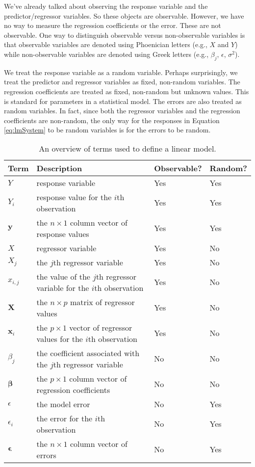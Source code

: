 \documentclass[
]{book}
\theoremstyle{definition}
\theoremstyle{definition}
\theoremstyle{definition}
\theoremstyle{definition}
\theoremstyle{remark}
\begin{document}
We've already talked about observing the response variable and the predictor/regressor variables. So these objects are observable. However, we have no way to measure the regression coefficients or the error. These are not observable. One way to distinguish observable versus non-observable variables is that observable variables are denoted using Phoenician letters (e.g., \(X\) and \(Y\)) while non-observable variables are denoted using Greek letters (e.g., \(\beta_j\), \(\epsilon\), \(\sigma^2\)).

We treat the response variable as a random variable. Perhaps surprisingly, we treat the predictor and regressor variables as fixed, non-random variables. The regression coefficients are treated as fixed, non-random but unknown values. This is standard for parameters in a statistical model. The errors are also treated as random variables. In fact, since both the regressor variables and the regression coefficients are non-random, the only way for the responses in Equation \eqref{eq:lmSystem} to be random variables is for the errors to be random.

\begin{table}

\caption{\label{tab:term-df}An overview of terms used to define a linear model.}
\centering
\begin{tabular}[t]{l>{\raggedright\arraybackslash}p{2in}ll}
\toprule
Term & Description & Observable? & Random?\\
\midrule
$Y$ & response variable & Yes & Yes\\
$Y_i$ & response value for the $i$th observation & Yes & Yes\\
$\mathbf{y}$ & the $n\times 1$ column vector of response values & Yes & Yes\\
$X$ & regressor variable & Yes & No\\
$X_j$ & the $j$th regressor variable & Yes & No\\
\addlinespace
$x_{i,j}$ & the value of the $j$th regressor variable for the $i$th observation & Yes & No\\
$\mathbf{X}$ & the $n\times p$ matrix of regressor values & Yes & No\\
$\mathbf{x}_i$ & the $p\times 1$ vector of regressor values for the $i$th observation & Yes & No\\
$\beta_j$ & the coefficient associated with the $j$th regressor variable & No & No\\
$\boldsymbol{\beta}$ & the $p\times 1$ column vector of regression coefficients & No & No\\
\addlinespace
$\epsilon$ & the model error & No & Yes\\
$\epsilon_i$ & the error for the $i$th observation & No & Yes\\
$\boldsymbol{\epsilon}$ & the $n\times 1$ column vector of errors & No & Yes\\
\bottomrule
\end{tabular}
\end{table}
\end{document}
